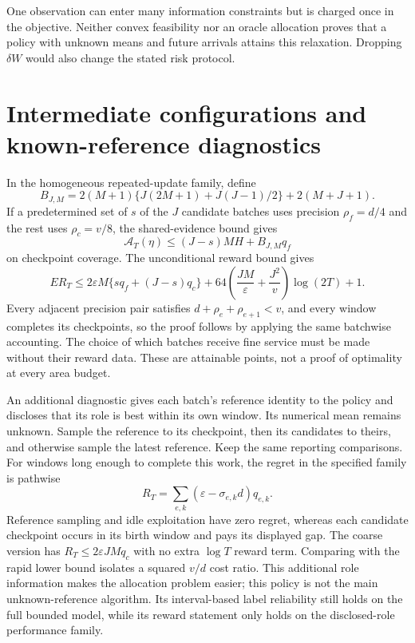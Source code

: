 One observation can enter many information constraints but is charged once
in the objective. Neither convex feasibility nor an oracle allocation proves
that a policy with unknown means and future arrivals attains this relaxation.
Dropping $\delta W$ would also change the stated risk protocol.

\section{Intermediate configurations and known-reference diagnostics}
\label{app:variants}

In the homogeneous repeated-update family, define
\[
 B_{J,M}=2(M+1)\{J(2M+1)+J(J-1)/2\}+2(M+J+1).
\]
If a predetermined set of $s$ of the $J$ candidate batches uses precision
$\rho_f=d/4$ and the rest uses $\rho_c=v/8$, the shared-evidence bound gives
\[
 \mathcal A_T(\eta)\le(J-s)MH+B_{J,M}q_f
\]
on checkpoint coverage. The unconditional reward bound gives
\[
 ER_T\le2\varepsilon M\{sq_f+(J-s)q_c\}
 +64\left(\frac{JM}{\varepsilon}+\frac{J^2}{v}\right)\log(2T)+1.
\]
Every adjacent precision pair satisfies
$d+\rho_e+\rho_{e+1}<v$, and every window completes its checkpoints, so
the proof follows by applying the same batchwise accounting. The choice of
which batches receive fine service must be made without their reward data.
These are attainable points, not a proof of optimality at every area budget.

An additional diagnostic gives each batch's reference identity to the policy
and discloses that its role is best within its own window. Its numerical mean
remains unknown. Sample the reference to its checkpoint, then its candidates
to theirs, and otherwise sample the latest reference. Keep the same reporting
comparisons. For windows long enough to complete this work, the regret in the
specified family is pathwise
\[
 R_T=\sum_{e,k}(\varepsilon-\sigma_{e,k}d)q_{e,k}.
\]
Reference sampling and idle exploitation have zero regret, whereas each
candidate checkpoint occurs in its birth window and pays its displayed gap.
The coarse version has $R_T\le2\varepsilon JM q_c$ with no extra $\log T$
reward term. Comparing with the rapid lower bound isolates a squared
$v/d$ cost ratio. This additional role information makes the allocation
problem easier; this policy is not the main unknown-reference algorithm.
Its interval-based label reliability still holds on the full bounded model,
while its reward statement only holds on the disclosed-role performance family.
